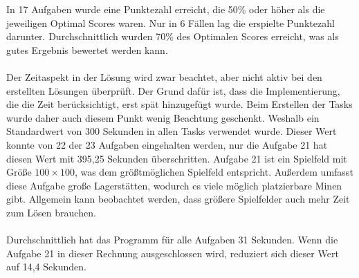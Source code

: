 In 17 Aufgaben wurde eine Punktezahl erreicht, die 50\% oder höher als die jeweiligen Optimal Scores waren. Nur in 6 Fällen lag die erspielte Punktezahl darunter. Durchschnittlich wurden 70\% des Optimalen Scores erreicht, was als gutes Ergebnis bewertet werden kann.
\\\\
Der Zeitaspekt in der Lösung wird zwar beachtet, aber nicht aktiv bei den erstellten Lösungen überprüft. Der Grund dafür ist, dass die Implementierung, die die Zeit berücksichtigt, erst spät hinzugefügt wurde. Beim Erstellen der Tasks wurde daher auch diesem Punkt wenig Beachtung geschenkt. Weshalb ein Standardwert von 300 Sekunden in allen Tasks verwendet wurde. Dieser Wert konnte von 22 der 23 Aufgaben eingehalten werden, nur die Aufgabe 21 hat diesen Wert mit 395,25 Sekunden überschritten. 
Aufgabe 21 ist ein Spielfeld mit Größe $100 \times 100$, was dem größtmöglichen Spielfeld entspricht. Außerdem umfasst diese Aufgabe große Lagerstätten, wodurch es viele möglich platzierbare Minen gibt. Allgemein kann beobachtet werden, dass größere Spielfelder auch mehr Zeit zum Lösen brauchen. 
\\\\
Durchschnittlich hat das Programm für alle Aufgaben 31 Sekunden. Wenn die Aufgabe 21 in dieser Rechnung ausgeschlossen wird, reduziert sich dieser Wert auf 14,4 Sekunden.












